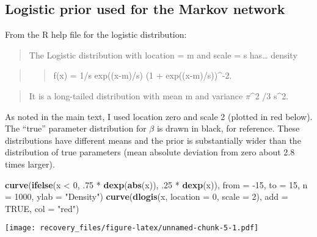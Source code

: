 \documentclass[11pt,]{article}
\newenvironment{Shaded}{\begin{snugshade}}{\end{snugshade}}
\newcommand{\KeywordTok}[1]{\textcolor[rgb]{0.13,0.29,0.53}{\textbf{{#1}}}}
\newcommand{\DataTypeTok}[1]{\textcolor[rgb]{0.13,0.29,0.53}{{#1}}}
\newcommand{\DecValTok}[1]{\textcolor[rgb]{0.00,0.00,0.81}{{#1}}}
\newcommand{\StringTok}[1]{\textcolor[rgb]{0.31,0.60,0.02}{{#1}}}
\newcommand{\OtherTok}[1]{\textcolor[rgb]{0.56,0.35,0.01}{{#1}}}
\newcommand{\NormalTok}[1]{{#1}}
\begin{document}
\subsection{Logistic prior used for the Markov
network}\label{logistic-prior-used-for-the-markov-network}

From the R help file for the logistic distribution:

\begin{quote}
The Logistic distribution with location = m and scale = s has\ldots{}
density
\end{quote}

\begin{quote}
\begin{quote}
f(x) = 1/s exp((x-m)/s) (1 + exp((x-m)/s))\^{}-2.
\end{quote}
\end{quote}

\begin{quote}
It is a long-tailed distribution with mean m and variance \(\pi\)\^{}2
/3 s\^{}2.
\end{quote}

As noted in the main text, I used location zero and scale 2 (plotted in
red below). The ``true'' parameter distribution for \(\beta\) is drawn
in black, for reference. These distributions have different means and
the prior is substantially wider than the distribution of true
parameters (mean absolute deviation from zero about 2.8 times larger).

\begin{Shaded}
\begin{Highlighting}[]
\KeywordTok{curve}\NormalTok{(}\KeywordTok{ifelse}\NormalTok{(x <}\StringTok{ }\DecValTok{0}\NormalTok{, .}\DecValTok{75} \NormalTok{*}\StringTok{ }\KeywordTok{dexp}\NormalTok{(}\KeywordTok{abs}\NormalTok{(x)), .}\DecValTok{25} \NormalTok{*}\StringTok{ }\KeywordTok{dexp}\NormalTok{(x)), }\DataTypeTok{from =} \NormalTok{-}\DecValTok{15}\NormalTok{, }\DataTypeTok{to =} \DecValTok{15}\NormalTok{,}
      \DataTypeTok{n =} \DecValTok{1000}\NormalTok{, }\DataTypeTok{ylab =} \StringTok{"Density"}\NormalTok{)}
\KeywordTok{curve}\NormalTok{(}\KeywordTok{dlogis}\NormalTok{(x, }\DataTypeTok{location =} \DecValTok{0}\NormalTok{, }\DataTypeTok{scale =} \DecValTok{2}\NormalTok{), }\DataTypeTok{add =} \OtherTok{TRUE}\NormalTok{, }\DataTypeTok{col =} \StringTok{"red"}\NormalTok{)}
\end{Highlighting}
\end{Shaded}

\texttt{[image: recovery\_files/figure-latex/unnamed-chunk-5-1.pdf]}
\end{document}
